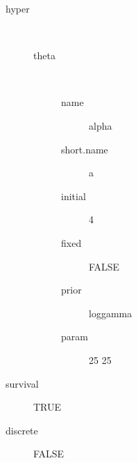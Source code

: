 \begin{description}
	\item[hyper]\ 
	 \begin{description}
	 	\item[theta]\ 
	 	 \begin{description}
	 	 	 \item[ name ] alpha 
	 	 	 \item[ short.name ] a 
	 	 	 \item[ initial ] 4 
	 	 	 \item[ fixed ] FALSE 
	 	 	 \item[ prior ] loggamma 
	 	 	 \item[ param ] 25 25 
	 	 \end{description}
	 \end{description}
	 \item[ survival ] TRUE 
	 \item[ discrete ] FALSE 
\end{description}
